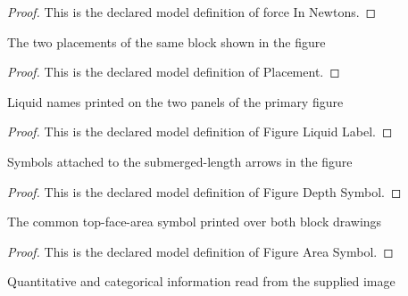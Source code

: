 \begin{proof}
  This is the declared model definition of force In Newtons.
\end{proof}
\begin{definition}[Placement]
  \label{def:physics:phyx-mini-0723:phyxminiproblems-problemphyxmini0723-placement}
  The two placements of the same block shown in the figure
\end{definition}
\begin{proof}
  This is the declared model definition of Placement.
\end{proof}
\begin{definition}
  \label{def:physics:phyx-mini-0723:phyxminiproblems-problemphyxmini0723-figureliquidlabel}
  Liquid names printed on the two panels of the primary figure
\end{definition}
\begin{proof}
  This is the declared model definition of Figure Liquid Label.
\end{proof}
\begin{definition}
  \label{def:physics:phyx-mini-0723:phyxminiproblems-problemphyxmini0723-figuredepthsymbol}
  Symbols attached to the submerged-length arrows in the figure
\end{definition}
\begin{proof}
  This is the declared model definition of Figure Depth Symbol.
\end{proof}
\begin{definition}
  \label{def:physics:phyx-mini-0723:phyxminiproblems-problemphyxmini0723-figureareasymbol}
  The common top-face-area symbol printed over both block drawings
\end{definition}
\begin{proof}
  This is the declared model definition of Figure Area Symbol.
\end{proof}
\begin{definition}
  \label{def:physics:phyx-mini-0723:phyxminiproblems-problemphyxmini0723-suppliedfigurereadout}
  Quantitative and categorical information read from the supplied image
\end{definition}
